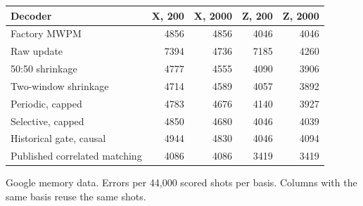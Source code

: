 \begin{center}\small
\begin{tabular}{lrrrr}
\hline
Decoder & X, 200 & X, 2000 & Z, 200 & Z, 2000 \\
\hline
Factory MWPM & 4856 & 4856 & 4046 & 4046 \\
Raw update & 7394 & 4736 & 7185 & 4260 \\
50:50 shrinkage & 4777 & 4555 & 4090 & 3906 \\
Two-window shrinkage & 4714 & 4589 & 4057 & 3892 \\
Periodic, capped & 4783 & 4676 & 4140 & 3927 \\
Selective, capped & 4850 & 4680 & 4046 & 4039 \\
Historical gate, causal & 4944 & 4830 & 4046 & 4094 \\
Published correlated matching & 4086 & 4086 & 3419 & 3419 \\
\hline\end{tabular}
\par\smallskip\parbox{0.93\linewidth}{\small Google memory data. Errors per 44,000 scored shots per basis. Columns with the same basis reuse the same shots.}
\end{center}
